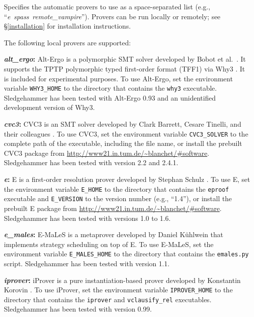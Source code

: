 \documentclass[a4paper,12pt]{article}
\newcommand\download{\url{http://www21.in.tum.de/~blanchet/\#software}}
\begin{document}
\begin{enum}
Specifies the automatic provers to use as a space-separated list (e.g.,
``\textit{e}~\textit{spass}~\textit{remote\_vampire\/}'').
Provers can be run locally or remotely; see \S\ref{installation} for
installation instructions.

The following local provers are supported:

\begin{sloppy}
\begin{enum}
\item[\labelitemi] \textbf{\textit{alt\_ergo}:} Alt-Ergo is a polymorphic
SMT solver developed by Bobot et al.\ \cite{alt-ergo}.
It supports the TPTP polymorphic typed first-order format (TFF1) via Why3
\cite{why3}. It is included for experimental purposes. To use Alt-Ergo, set the
environment variable \texttt{WHY3\_HOME} to the directory that contains the
\texttt{why3} executable. Sledgehammer has been tested with Alt-Ergo 0.93 and an
unidentified development version of Why3.

\item[\labelitemi] \textbf{\textit{cvc3}:} CVC3 is an SMT solver developed by
Clark Barrett, Cesare Tinelli, and their colleagues \cite{cvc3}. To use CVC3,
set the environment variable \texttt{CVC3\_SOLVER} to the complete path of the
executable, including the file name, or install the prebuilt CVC3 package from
\download. Sledgehammer has been tested with version 2.2 and 2.4.1.

\item[\labelitemi] \textbf{\textit{e}:} E is a first-order resolution prover
developed by Stephan Schulz \cite{schulz-2002}. To use E, set the environment
variable \texttt{E\_HOME} to the directory that contains the \texttt{eproof}
executable and \texttt{E\_VERSION} to the version number (e.g., ``1.4''), or
install the prebuilt E package from \download. Sledgehammer has been tested with
versions 1.0 to 1.6.

\item[\labelitemi] \textbf{\textit{e\_males}:} E-MaLeS is a metaprover developed
by Daniel K\"uhlwein that implements strategy scheduling on top of E. To use
E-MaLeS, set the environment variable \texttt{E\_MALES\_HOME} to the directory
that contains the \texttt{emales.py} script. Sledgehammer has been tested with
version 1.1.

\item[\labelitemi] \textbf{\textit{iprover}:} iProver is a pure
instantiation-based prover developed by Konstantin Korovin \cite{korovin-2009}.
To use iProver, set the environment variable \texttt{IPROVER\_HOME} to the
directory that contains the \texttt{iprover} and \texttt{vclausify\_rel}
executables. Sledgehammer has been tested with version 0.99.


\end{enum}
\end{sloppy}
\end{enum}
\end{document}
